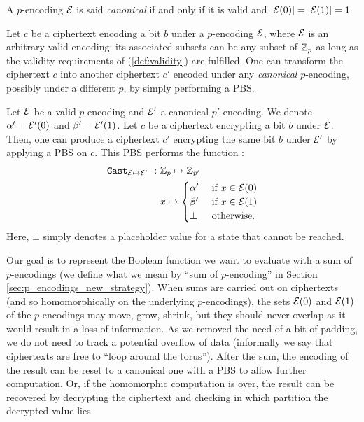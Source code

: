 \begin{definition}
    A $p$-encoding $\mathcal{E}$ is said \emph{canonical} if and only if it is valid and $\left| \mathcal{E}(0) \right| = \left| \mathcal{E}(1) \right| = 1$
    \label{def:canonical}
\end{definition}


Let $c$ be a ciphertext encoding a bit $b$ under a $p$-encoding $\mathcal{E}$, where $\mathcal{E}$ is an arbitrary valid encoding: its associated subsets can be any subset of $\mathbb{Z}_p$ as long as the validity requirements of (\ref{def:validity}) are fulfilled. One can transform the ciphertext $c$ into another ciphertext $c'$ encoded under any \emph{canonical} $p$-encoding, possibly under a different $p$, by simply performing a PBS.


\begin{property} 
    \label{prop:cast_valid_to_canonical}
    Let $\mathcal{E}$ be a valid $p$-encoding and $\mathcal{E}'$ a canonical $p'$-encoding. We denote $\alpha' = \mathcal{E}'(0)$ and $\beta' = \mathcal{E}'(1)$. Let $c$ be a ciphertext encrypting a bit $b$ under $\mathcal{E}$. Then, one can produce a ciphertext $c'$ encrypting the same bit $b$ under $\mathcal{E}'$ by applying a PBS on $c$. This PBS performs the function :
    \[
        \begin{aligned}
            \texttt{Cast}_{\mathcal{E} \mapsto \mathcal{E}'}~:~& \mathbb{Z}_p \mapsto \mathbb{Z}_{p'}\\
            & x \mapsto \begin{cases}
                            \alpha' & \text{ if } x \in \mathcal{E}(0)\\
                            \beta' & \text{ if } x \in \mathcal{E}(1)\\
                            \bot & \text{ otherwise.}
                        \end{cases}
        \end{aligned}
    \]
    Here, $\bot$ simply denotes a placeholder value for a state that cannot be reached.
\end{property}



Our goal is to represent the Boolean function we want to evaluate with a sum of $p$-encodings (we define what we mean by ``sum of $p$-encoding'' in Section \ref{sec:p_encodings_new_strategy}).  When sums are carried out on ciphertexts (and so homomorphically on the underlying $p$-encodings), the sets $\mathcal{E}(0)$ and $\mathcal{E}(1)$ of the $p$-encodings may move, grow, shrink, but they should never overlap as it would result in a loss of information. As we removed the need of a bit of padding, we do not need to track a potential overflow of data (informally we say that ciphertexts are free to ``loop around the torus''). After the sum, the encoding of the result can be reset to a canonical one with a PBS to allow further computation. Or, if the homomorphic computation is over, the result can be recovered by decrypting the ciphertext and checking in which partition the decrypted value lies.


